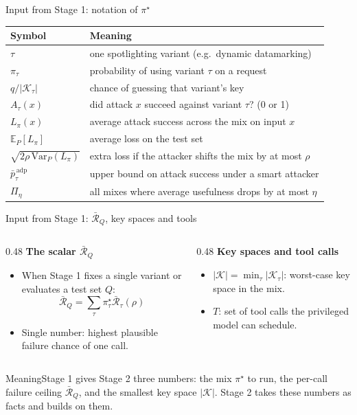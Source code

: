 \documentclass[aspectratio=169,11pt]{beamer}
\newcommand{\plain}[1]{\begin{block}{Meaning}#1\end{block}}
\begin{document}
\begin{frame}{Input from Stage 1: notation of $\pi^\star$}
  \centering\small
  \begin{tabular}{@{}ll@{}}
    \toprule
    \textbf{Symbol} & \textbf{Meaning} \\
    \midrule
    $\tau$ & one spotlighting variant (e.g.\ dynamic datamarking) \\
    $\pi_\tau$ & probability of using variant $\tau$ on a request \\
    $q / |\mathcal{K}_\tau|$ & chance of guessing that variant's key \\
    $A_\tau(x)$ & did attack $x$ succeed against variant $\tau$? (0 or 1) \\
    $L_\pi(x)$ & average attack success across the mix on input $x$ \\
    $\mathbb{E}_P[L_\pi]$ & average loss on the test set \\
    $\sqrt{2\rho\,\mathrm{Var}_P(L_\pi)}$ & extra loss if the attacker shifts the mix by at most $\rho$ \\
    $\bar p^{\,\mathrm{adp}}_\tau$ & upper bound on attack success under a smart attacker \\
    $\Pi_\eta$ & all mixes where average usefulness drops by at most $\eta$ \\
    \bottomrule
  \end{tabular}
\end{frame}

\begin{frame}{Input from Stage 1: $\bar{\mathcal{R}}_Q$, key spaces and tools}
  \begin{columns}[t, onlytextwidth]
    \begin{column}{0.48\textwidth}
      \small
      \textbf{The scalar $\bar{\mathcal{R}}_Q$}
      \begin{itemize}
        \item When Stage 1 fixes a single variant or evaluates a test set $Q$:
        \[
          \bar{\mathcal{R}}_Q = \sum_\tau \pi^\star_\tau \bar{\mathcal{R}}_\tau(\rho)
        \]
        \item Single number: highest plausible failure chance of one call.
      \end{itemize}
    \end{column}
    \begin{column}{0.48\textwidth}
      \small
      \textbf{Key spaces and tool calls}
      \begin{itemize}
        \item $|\mathcal{K}| = \min_\tau |\mathcal{K}_\tau|$: worst-case key space in the mix.
        \item $T$: set of tool calls the privileged model can schedule.
      \end{itemize}
    \end{column}
  \end{columns}
  \vspace{0.8em}
  \plain{Stage 1 gives Stage 2 three numbers: the mix $\pi^\star$ to run, the per-call failure ceiling $\bar{\mathcal{R}}_Q$, and the smallest key space $|\mathcal{K}|$. Stage 2 takes these numbers as facts and builds on them.}
\end{frame}
\end{document}
